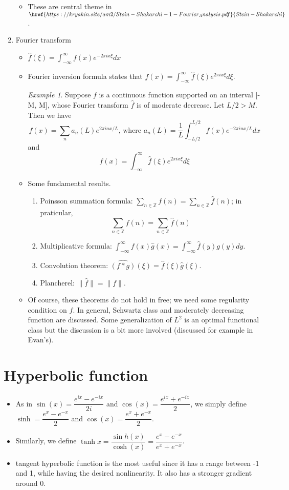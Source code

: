\documentclass[11pt,reqno]{amsart}
\theoremstyle{remark}
\newtheorem{example}{Example}
\begin{document}
\begin{enumerate}
\begin{itemize}
\item These are central theme in $\href{https://kryakin.site/am2/Stein-Shakarchi-1-Fourier_Analysis.pdf}{Stein-Shakarchi}$.
\end{itemize}
\item Fourier transform
\begin{itemize}
\item $\hat f(\xi)=\int^\infty_{-\infty}f(x)e^{-2\pi ix\xi}dx$
\item Fourier inversion formula states that $f(x)=\int^\infty_{-\infty}\hat f(\xi)e^{2\pi ix\xi}d\xi$.
\begin{example}
Suppose $f$ is a continuous function supported on an interval [-M, M], whose Fourier transform $\hat f$ is of moderate decrease. Let $L/2>M$. Then we have 
\[
f(x)=\sum_n a_n(L)e^{2\pi inx/L}\text{, where } a_n(L)=\frac 1L\int^{L/2}_{-L/2}f(x)e^{-2\pi inx/L}dx
\]
and
\[
f(x)=\int^{\infty}_{-\infty}\hat f(\xi)e^{2\pi ix\xi}d\xi
\]
\end{example}
\item Some fundamental results.
\begin{enumerate}
\item Poinsson summation formula: $\sum_{n\in\mathbb{Z}}f(n)=\sum_{n\in\mathbb{Z}}\hat f(n)$; in praticular, 
\[
\sum_{n\in\mathbb{Z}}f(n)=\sum_{n\in\mathbb{Z}}\hat f(n)
\]
\item Multiplicative formula: $\int^\infty_{-\infty}f(x)\hat g(x)=\int^\infty_{-\infty}\hat f(y)g(y)dy$.
\item Convolution theorem: $\widehat{(f * g)}(\xi)=\hat f(\xi)\hat g(\xi)$.
\item Plancherel: $\lVert \hat f\rVert=\lVert f\rVert$.
\end{enumerate}
\item Of course, these theorems do not hold in free; we need some regularity condition on $f$. In general, Schwartz class and moderately decreasing function 
are discussed. Some generalization of $L^2$ is an optimal functional class but the discussion is a bit more involved (discussed for example in Evan's). 
\end{itemize}
\end{enumerate}

\section{Hyperbolic function}
\begin{itemize}
\item As in $\sin(x)=\dfrac{e^{ix}-e^{-ix}}{2i}$ and $\cos(x)=\dfrac{e^{ix}+e^{-ix}}2$, we simply
 define $\sinh=\dfrac{e^{x}-e^{-x}}{2}$ and $\cos(x)=\dfrac{e^{x}+e^{-x}}2$.
\item Similarly, we define $\tanh x = \dfrac{\sin h(x)}{\cosh (x)}=\dfrac{e^x-e^{-x}}{e^x+e^{-x}}$.
\item tangent hyperbolic function is the most useful since it has a range between -1 and 1, 
while having the desired nonlinearity. It also has a stronger gradient around 0.
\end{itemize}
\end{document}
